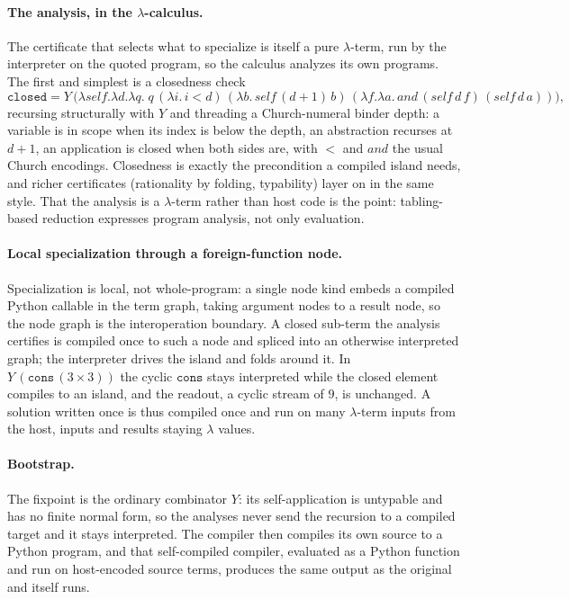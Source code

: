 \paragraph{The analysis, in the $\lambda$-calculus.}
The certificate that selects what to specialize is itself a pure $\lambda$-term, run by the
interpreter on the quoted program, so the calculus analyzes its own programs. The first and simplest
is a closedness check
\[
  \mathtt{closed} = Y\,\big(\lambda\mathit{self}.\lambda d.\lambda q.\;
    q\,(\lambda i.\, i < d)\,
    (\lambda b.\,\mathit{self}\,(d{+}1)\,b)\,
  (\lambda f.\lambda a.\,\mathit{and}\,(\mathit{self}\,d\,f)\,(\mathit{self}\,d\,a))\big),
\]
recursing structurally with $Y$ and threading a Church-numeral binder depth: a variable is in scope
when its index is below the depth, an abstraction recurses at $d+1$, an application is closed when
both sides are, with $<$ and $\mathit{and}$ the usual Church encodings. Closedness is exactly the
precondition a compiled island needs, and richer certificates (rationality by folding, typability)
layer on in the same style. That the analysis is a $\lambda$-term rather than host code is the point:
tabling-based reduction expresses program analysis, not only evaluation.

\paragraph{Local specialization through a foreign-function node.}
Specialization is local, not whole-program: a single node kind embeds a compiled Python callable in
the term graph, taking argument nodes to a result node, so the node graph is the interoperation
boundary. A closed sub-term the analysis certifies is compiled once to such a node and spliced into an
otherwise interpreted graph; the interpreter drives the island and folds around it. In
$Y\,(\mathtt{cons}\,(3 \times 3))$ the cyclic $\mathtt{cons}$ stays interpreted while the closed
element compiles to an island, and the readout, a cyclic stream of $9$, is unchanged. A solution
written once is thus compiled once and run on many $\lambda$-term inputs from the host, inputs and
results staying $\lambda$ values.

\paragraph{Bootstrap.}
The fixpoint is the ordinary combinator $Y$: its self-application is untypable and has no finite
normal form, so the analyses never send the recursion to a compiled target and it stays
interpreted. The compiler then compiles
its own source to a Python program, and that self-compiled compiler, evaluated as a Python function
and run on host-encoded source terms, produces the same output as the original and itself runs.

